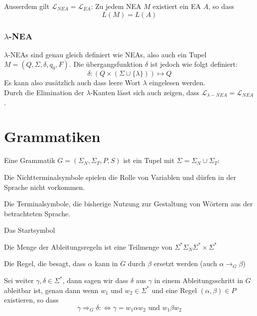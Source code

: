 \documentclass[11pt]{article}
\begin{document}
Ausserdem gilt $\mathcal{L}_{NEA} = \mathcal{L}_{EA}$: Zu jedem NEA $M$ existiert ein EA $A$, so dass
\begin{equation*}
	L(M) = L(A)
\end{equation*}

\subsubsection{$\lambda$-NEA}

$\lambda$-NEAs sind genau gleich definiert wie NEAs, also auch ein Tupel $M = (Q, \Sigma, \delta, q_0, F)$. Die {\"u}bergangsfunktion $\delta$ ist jedoch wie folgt definiert:
\begin{equation*}
	\delta: (Q\times(\Sigma \cup \{\lambda\})) \mapsto Q
\end{equation*}
Es kann also zus{\"a}tzlich auch dass leere Wort $\lambda$ eingelesen werden. \\

Durch die Elimination der $\lambda$-Kanten l{\"a}sst sich auch zeigen, dass $\mathcal{L}_{\lambda-NEA} = \mathcal{L}_{NEA}$.

\section{Grammatiken}

Eine Grammatik $G = (\Sigma_N, \Sigma_T, P, S)$ ist ein Tupel mit $\Sigma = \Sigma_N \cup \Sigma_T$:

\begin{description}[labelindent=16pt,style=multiline,leftmargin=3cm, noitemsep]
	\item[$\Sigma_N$:] Die Nichtterminalsymbole spielen die Rolle von Variablen und d{\"u}rfen in der Sprache nicht vorkommen.
	\item[$\Sigma_T$:] Die Terminalsymbole, die bisherige Nutzung zur Gestaltung von W{\"o}rtern aus der betrachteten Sprache.
	\item[$S \in \Sigma_N$:] Das Startsymbol
	\item[$P$:] Die Menge der Ableitungsregeln ist eine Teilmenge von $\Sigma^*\Sigma_N\Sigma^* \times \Sigma^*$
	\item[$(\alpha, \beta) \in P$:] Die Regel, die besagt, dass $\alpha$ kann in $G$ durch $\beta$ ersetzt werden (auch $\alpha \rightarrow_G \beta$)
\end{description}

Sei weiter $\gamma, \delta \in \Sigma^*$, dann sagen wir dass $\delta$ aus $\gamma$ in einem Ableitungsschritt in $G$ ableitbar ist, genau dann wenn $w_1$ und $w_2 \in \Sigma^*$ und eine Regel $(\alpha, \beta) \in P$ existieren, so dass
\begin{equation*}
	\gamma \Rightarrow_G \delta :\Leftrightarrow \gamma = w_1\alpha w_2 \text{ und } w_1\beta w_2
\end{equation*}
\end{document}
